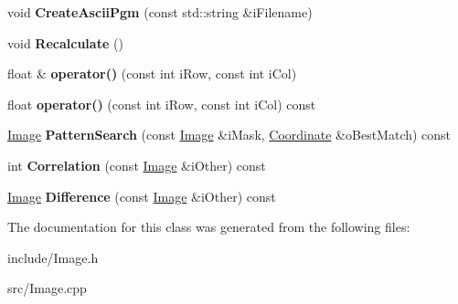 \begin{DoxyCompactItemize}
\item 
\hypertarget{classImage_a1351003ce96c6ec81f8e4b0e13e35233}{void {\bfseries Create\-Ascii\-Pgm} (const std\-::string \&i\-Filename)}\label{classImage_a1351003ce96c6ec81f8e4b0e13e35233}

\item 
\hypertarget{classImage_a30c7f00bb4c397a30e158f2da7465426}{void {\bfseries Recalculate} ()}\label{classImage_a30c7f00bb4c397a30e158f2da7465426}

\item 
\hypertarget{classImage_ad26d6cbaf59c26f9475e2b33188f398e}{float \& {\bfseries operator()} (const int i\-Row, const int i\-Col)}\label{classImage_ad26d6cbaf59c26f9475e2b33188f398e}

\item 
\hypertarget{classImage_a5fa8be39a79f9f98300e3fea8a902c59}{float {\bfseries operator()} (const int i\-Row, const int i\-Col) const }\label{classImage_a5fa8be39a79f9f98300e3fea8a902c59}

\item 
\hypertarget{classImage_a1f640b89c8f8f9d9abc69c3ccb9afaf8}{\hyperlink{classImage}{Image} {\bfseries Pattern\-Search} (const \hyperlink{classImage}{Image} \&i\-Mask, \hyperlink{structCoordinate}{Coordinate} \&o\-Best\-Match) const }\label{classImage_a1f640b89c8f8f9d9abc69c3ccb9afaf8}

\item 
\hypertarget{classImage_ae1561a04dad8a6aad0cb38933184ca02}{int {\bfseries Correlation} (const \hyperlink{classImage}{Image} \&i\-Other) const }\label{classImage_ae1561a04dad8a6aad0cb38933184ca02}

\item 
\hypertarget{classImage_a1c21f181bede39438721517ce2e64605}{\hyperlink{classImage}{Image} {\bfseries Difference} (const \hyperlink{classImage}{Image} \&i\-Other) const }\label{classImage_a1c21f181bede39438721517ce2e64605}

\end{DoxyCompactItemize}


The documentation for this class was generated from the following files\-:\begin{DoxyCompactItemize}
\item 
include/Image.\-h\item 
src/Image.\-cpp\end{DoxyCompactItemize}
